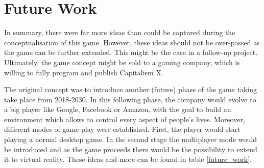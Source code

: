 \documentclass[11pt,titlepage,oneside,openany]{book}
\begin{document}
\section{Future Work}
\label{sec:future}
In summary, there were far more ideas than could be captured during the conceptualisation of this game. However, these ideas should not be over-passed as the game can be further extended. This might be the case in a follow-up project. Ultimately, the game concept might be sold to a gaming company, which is willing to fully program and publish Capitalism X. 

The original concept was to introduce another (future) phase of the game taking take place from 2018-2030. In this following phase, the company would evolve to a big player like Google, Facebook or Amazon, with the goal to build an environment which allows to control every aspect of people’s lives. 
Moreover, different modes of game-play were established. First, the player would start playing a normal desktop game. In the second stage the multiplayer mode would be introduced and as the game proceeds there would be the possibility to extend it to virtual reality. These ideas and more can be found in table \ref{future_work}.
\end{document}
